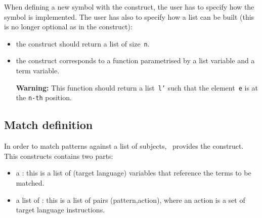 \noindent\label{oparraydef}
When defining a new symbol with the  construct,
the user has to specify how the symbol is implemented. 
The user has also to specify how a list can be built (this is no 
longer optional as in the  construct):
\begin{itemize}
\item\label{emptyarray} the  construct should return a list of
  size~\texttt{n}.  

\item\label{append} the  construct corresponds to a
  function parametrised by a list variable and a term variable. 

\textbf{Warning: }
This function should return a list~\texttt{l'} such that
  the element~\texttt{e} is at the \texttt{n-th} position.
\end{itemize}

\subsection{Match definition}

In order to match patterns against a list of subjects, \TOM\ provides
the  construct.
This constructs contains two parts:
\begin{itemize}
\item a : this is a list of (target
  language) variables that reference the terms to be matched.
\item a list of : this is a list of pairs
  (pattern,action), where an action is a set of target language
  instructions.  
\end{itemize}

